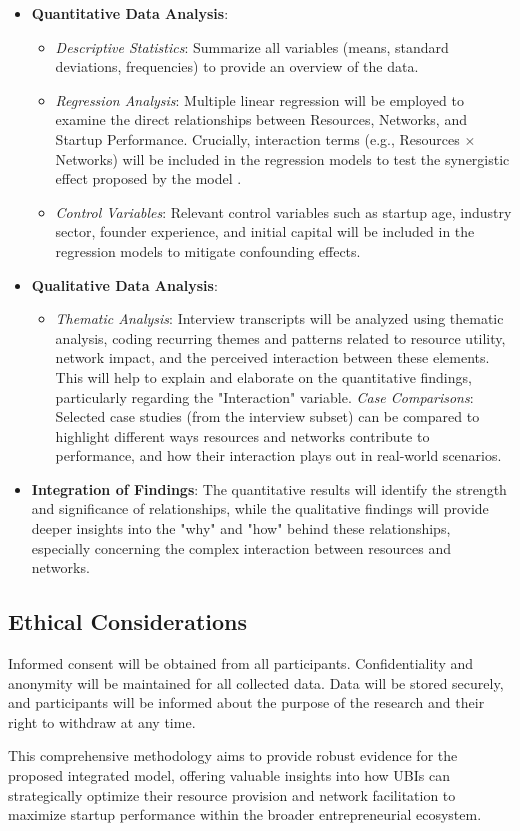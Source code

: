 \documentclass[../Main.tex]{subfiles}
\begin{document}
\begin{itemize}
    \item \textbf{Quantitative Data Analysis}:
    \begin{itemize}
        \item \textit{Descriptive Statistics}: Summarize all variables (means, standard deviations, frequencies) to provide an overview of the data.
        \item \textit{Regression Analysis}: Multiple linear regression will be employed to examine the direct relationships between Resources, Networks, and Startup Performance. Crucially, interaction terms (e.g., Resources $\times$ Networks) will be included in the regression models to test the synergistic effect proposed by the model \cite{al2017challenges}.
        \item \textit{Control Variables}: Relevant control variables such as startup age, industry sector, founder experience, and initial capital will be included in the regression models to mitigate confounding effects.
    \end{itemize}
    \item \textbf{Qualitative Data Analysis}:
    \begin{itemize}
        \item \textit{Thematic Analysis}: Interview transcripts will be analyzed using thematic analysis, coding recurring themes and patterns related to resource utility, network impact, and the perceived interaction between these elements. This will help to explain and elaborate on the quantitative findings, particularly regarding the "Interaction" variable.
        \textit{Case Comparisons}: Selected case studies (from the interview subset) can be compared to highlight different ways resources and networks contribute to performance, and how their interaction plays out in real-world scenarios.
    \end{itemize}
    \item \textbf{Integration of Findings}: The quantitative results will identify the strength and significance of relationships, while the qualitative findings will provide deeper insights into the "why" and "how" behind these relationships, especially concerning the complex interaction between resources and networks.
\end{itemize}

\subsection{Ethical Considerations}
Informed consent will be obtained from all participants. Confidentiality and anonymity will be maintained for all collected data. Data will be stored securely, and participants will be informed about the purpose of the research and their right to withdraw at any time.

This comprehensive methodology aims to provide robust evidence for the proposed integrated model, offering valuable insights into how UBIs can strategically optimize their resource provision and network facilitation to maximize startup performance within the broader entrepreneurial ecosystem.
	
\end{document}
